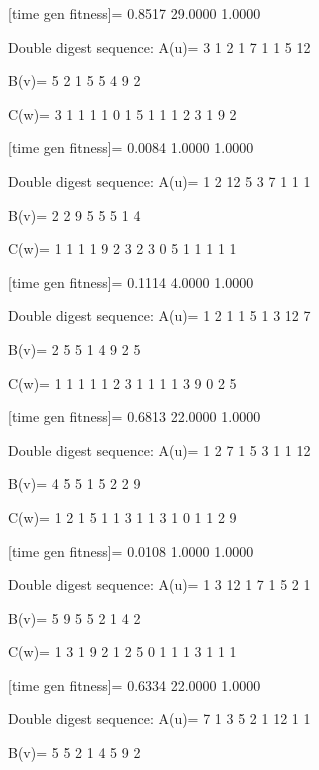 [time gen fitness]=
    0.8517   29.0000    1.0000

Double digest sequence:
A(u)=
     3     1     2     1     7     1     1     5    12

B(v)=
     5     2     1     5     5     4     9     2

C(w)=
     3     1     1     1     1     0     1     5     1     1     1     2     3     1     9     2

[time gen fitness]=
    0.0084    1.0000    1.0000

Double digest sequence:
A(u)=
     1     2    12     5     3     7     1     1     1

B(v)=
     2     2     9     5     5     5     1     4

C(w)=
     1     1     1     1     9     2     3     2     3     0     5     1     1     1     1     1

[time gen fitness]=
    0.1114    4.0000    1.0000

Double digest sequence:
A(u)=
     1     2     1     1     5     1     3    12     7

B(v)=
     2     5     5     1     4     9     2     5

C(w)=
     1     1     1     1     1     2     3     1     1     1     1     3     9     0     2     5

[time gen fitness]=
    0.6813   22.0000    1.0000

Double digest sequence:
A(u)=
     1     2     7     1     5     3     1     1    12

B(v)=
     4     5     5     1     5     2     2     9

C(w)=
     1     2     1     5     1     1     3     1     1     3     1     0     1     1     2     9

[time gen fitness]=
    0.0108    1.0000    1.0000

Double digest sequence:
A(u)=
     1     3    12     1     7     1     5     2     1

B(v)=
     5     9     5     5     2     1     4     2

C(w)=
     1     3     1     9     2     1     2     5     0     1     1     1     3     1     1     1

[time gen fitness]=
    0.6334   22.0000    1.0000

Double digest sequence:
A(u)=
     7     1     3     5     2     1    12     1     1

B(v)=
     5     5     2     1     4     5     9     2

